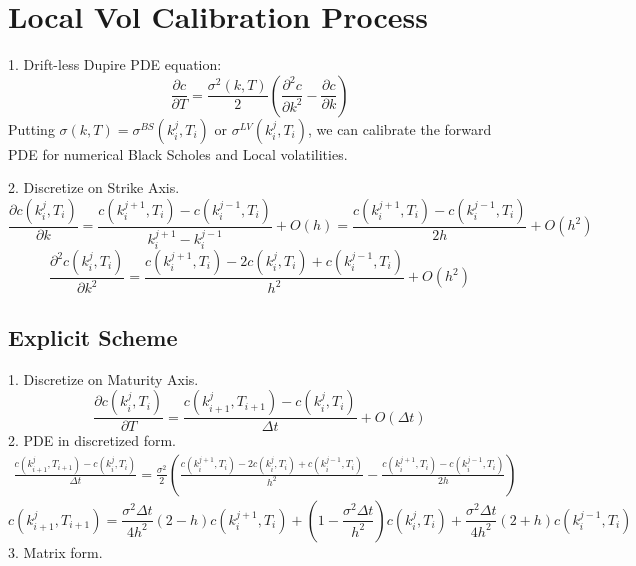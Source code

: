 \documentclass[12pt]{article}
\begin{document}
\section{Local Vol Calibration Process}
1. Drift-less Dupire PDE equation:
\begin{equation}
    \frac{\partial c}{\partial T}=\frac{\sigma^2(k,T)}{2}\left(\frac{\partial^2 c}{\partial k^2}-\frac{\partial c}{\partial k}\right)
\end{equation}
Putting $\sigma(k,T) = \sigma^{BS}(k^j_i,T_i)$ or $\sigma^{LV}(k^j_i,T_i)$, we can calibrate the forward PDE for numerical Black Scholes and Local volatilities.\par
2. Discretize on Strike Axis.
\begin{equation}
    \frac{\partial c(k^j_i,T_i)}{\partial k}=\frac{c(k^{j+1}_i,T_i)-c(k^{j-1}_i,T_i)}{k^{j+1}_i-k^{j-1}_i}+O(h)=\frac{c(k^{j+1}_i,T_i)-c(k^{j-1}_i,T_i)}{2h}+O(h^2)
\end{equation}
\begin{equation}
    \frac{\partial^2 c(k^j_i,T_i)}{\partial k^2}=\frac{c(k^{j+1}_i,T_i)-2c(k^{j}_i,T_i)+c(k^{j-1}_i,T_i)}{h^2}+O(h^2)
\end{equation}

\subsection{Explicit Scheme}
1. Discretize on Maturity Axis.
\begin{equation}
    \frac{\partial c(k^j_i,T_i)}{\partial T}=\frac{c(k^j_{i+1},T_{i+1})-c(k^j_i,T_i)}{\Delta t}+O(\Delta t)
\end{equation}
2. PDE in discretized form.
\begin{equation}
\begin{split}
    \frac{c(k^j_{i+1},T_{i+1})-c(k^j_i,T_i)}{\Delta t}=\frac{\sigma^2}{2}\left(\frac{c(k^{j+1}_i,T_i)-2c(k^{j}_i,T_i)+c(k^{j-1}_i,T_i)}{h^2} - \frac{c(k^{j+1}_i,T_i)-c(k^{j-1}_i,T_i)}{2h} \right)
\end{split}
\end{equation}
\begin{equation}
    c(k^j_{i+1},T_{i+1})=\frac{\sigma^2\Delta t}{4h^2}(2-h)c(k^{j+1}_i,T_i)+(1-\frac{\sigma^2\Delta t}{h^2})c(k^j_i,T_i)+\frac{\sigma^2\Delta t}{4h^2}(2+h)c(k^{j-1}_i,T_i)
\end{equation}
3. Matrix form.
\end{document}
